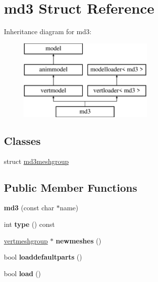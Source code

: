 \hypertarget{structmd3}{}\section{md3 Struct Reference}
\label{structmd3}
Inheritance diagram for md3\+:\begin{figure}[H]
\begin{center}
\leavevmode
\includegraphics[height=4.000000cm]{structmd3}
\end{center}
\end{figure}
\subsection*{Classes}
\begin{DoxyCompactItemize}
\item 
struct \hyperlink{structmd3_1_1md3meshgroup}{md3meshgroup}
\end{DoxyCompactItemize}
\subsection*{Public Member Functions}
\begin{DoxyCompactItemize}
\item 
\mbox{\label{structmd3_aecda38dc19f747d44ab22dbd6a8212d7}} 
{\bfseries md3} (const char $\ast$name)
\item 
\mbox{\label{structmd3_ab856147984966f86b97e3cbf8368a1bb}} 
int {\bfseries type} () const
\item 
\mbox{\label{structmd3_a4f6f5e2aee63d98961acec2ff5bc0d95}} 
\hyperlink{structvertmodel_1_1vertmeshgroup}{vertmeshgroup} $\ast$ {\bfseries newmeshes} ()
\item 
\mbox{\label{structmd3_acc16fd6163997c2137568f432217b69d}} 
bool {\bfseries loaddefaultparts} ()
\item 
\mbox{\label{structmd3_ad37a400fe86a2c6f075486557959d852}} 
bool {\bfseries load} ()
\end{DoxyCompactItemize}
